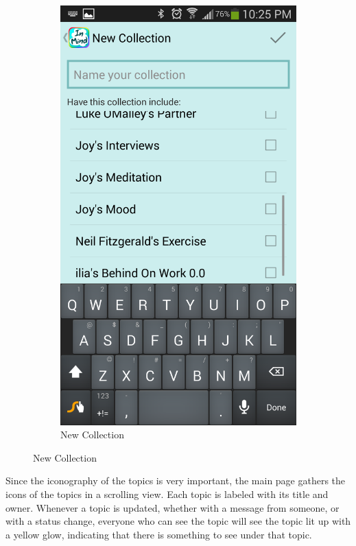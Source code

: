 \begin{figure}
\begin{subfigure}[b]{0.3\textwidth}
        \includegraphics[width=\textwidth]{new_collection.png}
        \caption{New Collection}
      \end{subfigure}
      \label{fig:home_screen}
    \end{figure}

      Since the iconography of the topics is very important,
      the main page gathers the icons of the topics in a scrolling view.
      Each topic is labeled with its title and owner.
      Whenever a topic is updated, whether with a message from someone,
      or with a status change, everyone who can see the topic will see the topic
      lit up with a yellow glow, indicating that there is something to see under that topic.

